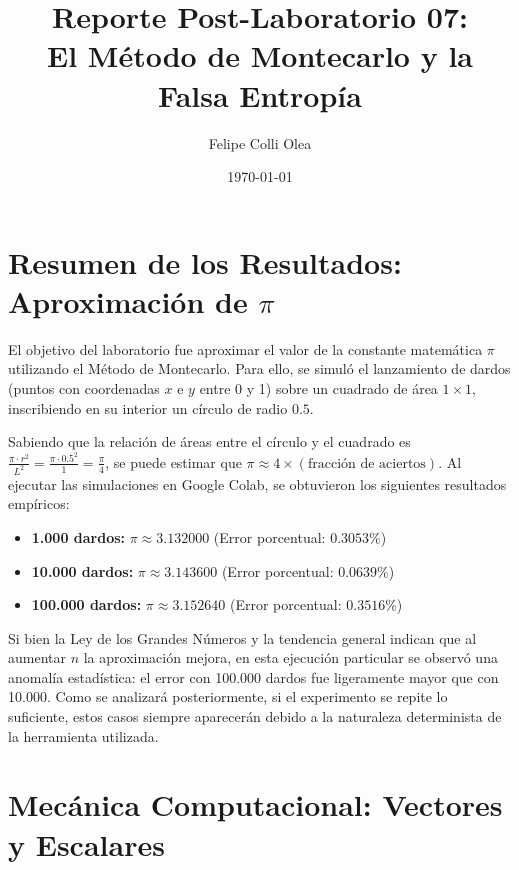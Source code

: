 \documentclass[11pt]{article}
\title{Reporte Post-Laboratorio 07: \\ \large{El Método de Montecarlo y la Falsa Entropía}}
\author{Felipe Colli Olea}
\date{\today}
\begin{document}
\maketitle
\thispagestyle{fancy}

\section{Resumen de los Resultados: Aproximación de $\pi$}

El objetivo del laboratorio fue aproximar el valor de la constante matemática $\pi$ utilizando el Método de Montecarlo. Para ello, se simuló el lanzamiento de dardos (puntos con coordenadas $x$ e $y$ entre 0 y 1) sobre un cuadrado de área $1 \times 1$, inscribiendo en su interior un círculo de radio $0.5$. 

Sabiendo que la relación de áreas entre el círculo y el cuadrado es $\frac{\pi \cdot r^2}{L^2} = \frac{\pi \cdot 0.5^2}{1} = \frac{\pi}{4}$, se puede estimar que $\pi \approx 4 \times (\text{fracción de aciertos})$. Al ejecutar las simulaciones en Google Colab, se obtuvieron los siguientes resultados empíricos:

\begin{itemize}
    \item \textbf{1.000 dardos:} $\pi \approx 3.132000$ (Error porcentual: $0.3053\%$)
    \item \textbf{10.000 dardos:} $\pi \approx 3.143600$ (Error porcentual: $0.0639\%$)
    \item \textbf{100.000 dardos:} $\pi \approx 3.152640$ (Error porcentual: $0.3516\%$)
\end{itemize}

Si bien la Ley de los Grandes Números y la tendencia general indican que al aumentar $n$ la aproximación mejora, en esta ejecución particular se observó una anomalía estadística: el error con 100.000 dardos fue ligeramente mayor que con 10.000. Como se analizará posteriormente, si el experimento se repite lo suficiente, estos casos siempre aparecerán debido a la naturaleza determinista de la herramienta utilizada.

\section{Mecánica Computacional: Vectores y Escalares}
\end{document}
